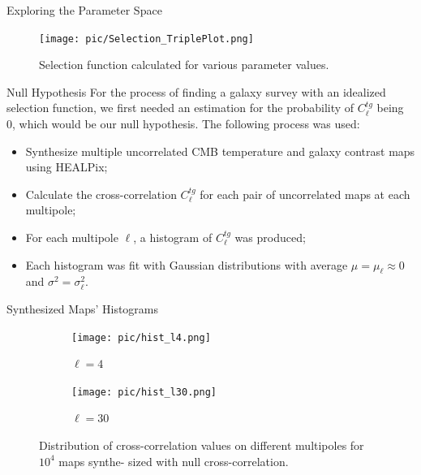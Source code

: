 \documentclass[serif, aspectratio=169]{beamer}
\begin{document}
\begin{frame}{Exploring the Parameter Space}
    \begin{figure}
        \centering
        \texttt{[image: pic/Selection\_TriplePlot.png]}
        \caption{Selection function calculated for various parameter values.}
        \label{fig:selection_triplePlot}
    \end{figure}
\end{frame}

\begin{frame}{Null Hypothesis}
    For the process of finding a galaxy survey with an idealized selection function, we first needed an estimation for the probability of $C_\ell^{tg}$ being 0, which would be our null hypothesis. The following process was used: 

    \begin{itemize}
        \item Synthesize multiple uncorrelated CMB temperature and galaxy contrast maps using HEALPix;
        \item Calculate the cross-correlation $C_\ell^{tg}$ for each pair of uncorrelated maps at each multipole;
        \item For each multipole $\ell$, a histogram of $C_\ell^{tg}$ was produced;
        \item Each histogram was fit with Gaussian distributions with average $\mu=\mu_\ell\approx 0$ and $\sigma^2=\sigma_\ell^2$.
    \end{itemize}
\end{frame}

\begin{frame}{Synthesized Maps' Histograms}
    \begin{figure}

        \begin{subfigure}[b]{0.45\linewidth}
            \centering
            \texttt{[image: pic/hist\_l4.png]}
            \caption{$\ell=4$}
            \label{fig:hist_l4}
        \end{subfigure}
        \hfill
        \begin{subfigure}[b]{0.45\linewidth}
            \centering
            \texttt{[image: pic/hist\_l30.png]}
            \caption{$\ell=30$}
            \label{fig:hist_l30}
        \end{subfigure}
        
        \caption{Distribution of cross-correlation values on different multipoles for $10^4$ maps synthe-
sized with null cross-correlation.}
        \label{fig:hists}
    \end{figure}
\end{frame}
\end{document}
